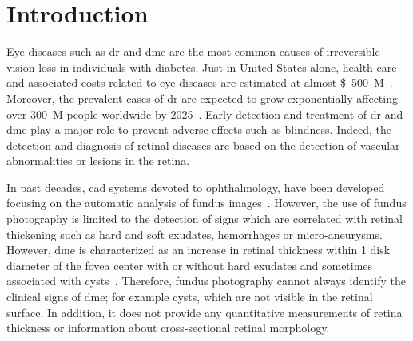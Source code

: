 \graphicspath{ {./content/intro/figures/} }

\section{Introduction}

Eye diseases such as \ac{dr} and \ac{dme} are the most common causes of irreversible vision loss in individuals with diabetes.
Just in United States alone, health care and associated costs related to eye diseases are estimated at almost \SI{500}[\$]{M}~\cite{Sharma2005}.
Moreover, the prevalent cases of \ac{dr} are expected to grow exponentially affecting over \SI{300}{M} people worldwide by 2025~\cite{Wild2004}.
Early detection and treatment of \ac{dr} and \ac{dme} play a major role to prevent adverse effects such as blindness.
Indeed, the detection and diagnosis of retinal diseases are based on the detection of vascular abnormalities or lesions in the retina. 

In past decades, \ac{cad} systems devoted to ophthalmology, have been developed focusing on the automatic analysis of fundus images~\cite{Abramoff2010,Trucco2013}.
However, the use of fundus photography is limited to the detection of signs which are correlated with retinal thickening such as hard and soft exudates, hemorrhages or micro-aneurysms.
However, \ac{dme} is characterized as an increase in retinal thickness within 1 disk diameter of the fovea center with or without hard exudates and sometimes associated with cysts~\cite{ETDRSG1985}.
Therefore, fundus photography cannot always identify the clinical signs of \ac{dme}; for example cysts, which are not visible in the retinal surface. In addition, it does not provide any quantitative measurements of retina thickness or information about cross-sectional retinal morphology. 

